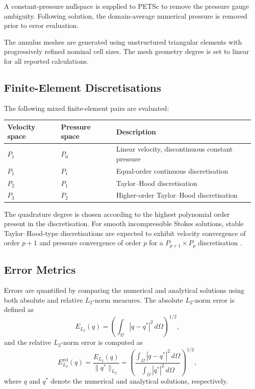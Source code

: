 \documentclass[gmd, manuscript]{copernicus}
\begin{document}
A constant-pressure nullspace is supplied to PETSc to remove the pressure gauge ambiguity.
Following solution, the domain-average numerical pressure is removed prior to error evaluation.

The annulus meshes are generated using unstructured triangular elements with progressively refined nominal cell sizes.
The mesh geometry degree is set to linear for all reported calculations.

\subsection{Finite-Element Discretisations}

The following mixed finite-element pairs are evaluated:
\begin{table}[H]
\centering
\begin{tabular}{lll}
\toprule
Velocity space & Pressure space & Description \\
\midrule
\(P_1\) & \(P_0\) & Linear velocity, discontinuous constant pressure \\
\(P_1\) & \(P_1\) & Equal-order continuous discretisation \\
\(P_2\) & \(P_1\) & Taylor--Hood discretisation \\
\(P_3\) & \(P_2\) & Higher-order Taylor--Hood discretisation \\
\bottomrule
\end{tabular}
\end{table}

The quadrature degree is chosen according to the highest polynomial order present in the discretisation.
For smooth incompressible Stokes solutions, stable Taylor--Hood-type discretisations are expected to exhibit velocity convergence of order \(p+1\) and pressure convergence of order \(p\) for a \(P_{p+1}\times P_p\) discretisation \citep{girault1986,boffi2013}.

\subsection{Error Metrics}

Errors are quantified by comparing the numerical and analytical
solutions using both absolute and relative \(L_2\)-norm measures.
The absolute \(L_2\)-norm error is defined as
\begin{equation}
  E_{L_2}(q)
  =
  \left(
  \int_\Omega |q-q^*|^2 \, d\Omega
  \right)^{1/2},
\end{equation}
and the relative \(L_2\)-norm error is computed as
\begin{equation}
  E_{L_2}^{\mathrm{rel}}(q)
  =
  \frac{E_{L_2}(q)}{\|q^*\|_{L_2}}
  =
  \left(
  \frac{\int_\Omega |q-q^*|^2\,d\Omega}
       {\int_\Omega |q^*|^2\,d\Omega}
  \right)^{1/2},
\end{equation}
where \(q\) and \(q^*\) denote the numerical and analytical
solutions, respectively.
\end{document}
